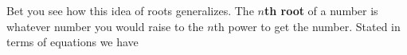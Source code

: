 Bet you see how this idea of roots generalizes.  The \textbf{$n$th root} of a number is whatever number you would raise to the $n$th power to get the number.  Stated in terms of equations we have

 \bigskip
\bigskip



%